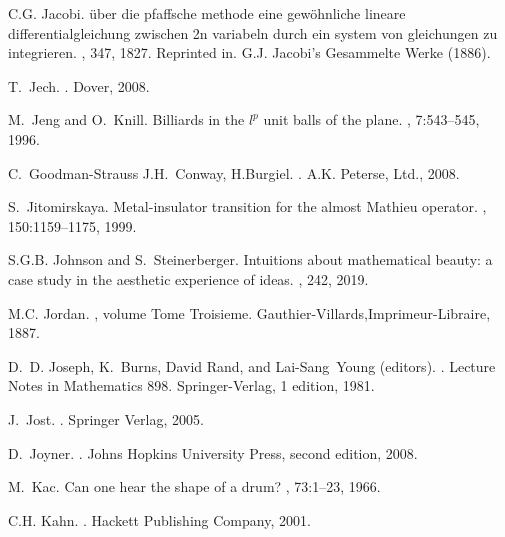 \documentclass[12pt]{amsart}
\begin{document}
\begin{thebibliography}{100}
C.G. Jacobi.
\newblock \"uber die pfaffsche methode eine gew\"ohnliche lineare
  differentialgleichung zwischen 2n variabeln durch ein system von gleichungen
  zu integrieren.
, 347, 1827.
\newblock Reprinted in. G.J. Jacobi's Gesammelte Werke (1886).

T.~Jech.
.
\newblock Dover, 2008.

M.~Jeng and O.~Knill.
\newblock Billiards in the $l^p$ unit balls of the plane.
, 7:543--545, 1996.

C.~Goodman-Strauss J.H.~Conway, H.Burgiel.
.
\newblock A.K. Peterse, Ltd., 2008.

S.~Jitomirskaya.
\newblock Metal-insulator transition for the almost {M}athieu operator.
, 150:1159--1175, 1999.

S.G.B. Johnson and S.~Steinerberger.
\newblock Intuitions about mathematical beauty: a case study in the aesthetic
  experience of ideas.
, 242, 2019.

M.C. Jordan.
, volume Tome Troisieme.
\newblock Gauthier-Villards,Imprimeur-Libraire, 1887.

D.~D. Joseph, K.~Burns, David Rand, and Lai-Sang~Young (editors).
.
\newblock Lecture Notes in Mathematics 898. Springer-Verlag, 1 edition, 1981.

J.~Jost.
.
\newblock Springer Verlag, 2005.

D.~Joyner.
.
\newblock Johns Hopkins University Press, second edition, 2008.

M.~Kac.
\newblock Can one hear the shape of a drum?
, 73:1--23, 1966.

C.H. Kahn.
.
\newblock Hackett Publishing Company, 2001.


\end{thebibliography}
\end{document}
